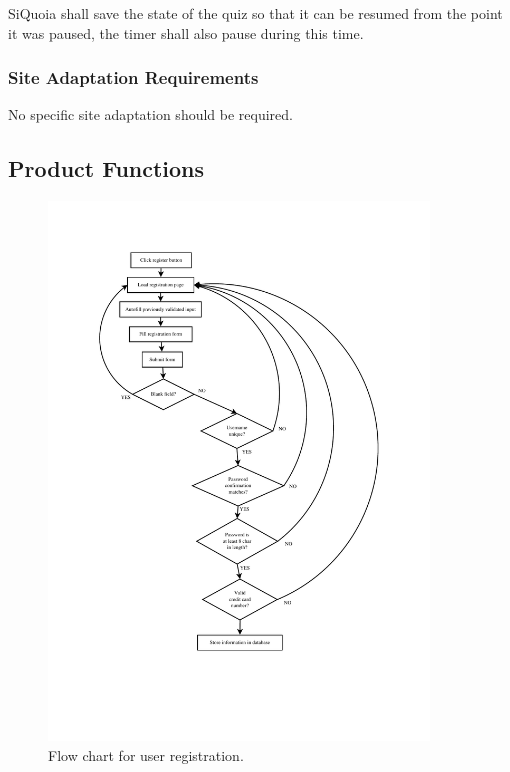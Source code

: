 \documentclass[12pt]{paper}
\begin{document}
SiQuoia shall save the state of the quiz so that it can be resumed
from the point it was paused, the timer shall also pause during this
time.

\subsubsection{Site Adaptation Requirements}
No specific site adaptation should be required.

\subsection{Product Functions}

\begin{figure}[h!]
\centering
\includegraphics[width=0.9\textwidth]{flowcharts/registration}
\caption{Flow chart for user registration.}
\end{figure}
\end{document}
